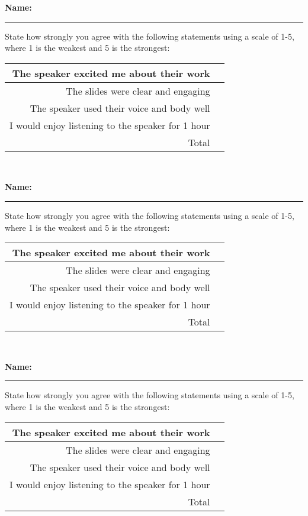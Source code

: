 \documentclass[12pt]{article}
\date{ \ }
\begin{document}
\vspace{5mm}

\noindent\textbf{Name:} \rule{9cm}{0.4pt}

State how strongly you agree with the following statements using a scale of 1-5, where 1 is the weakest and 5 is the strongest: 

\begin{center}
\begin{tabular}{|r| p{2cm} |}
  \hline
The speaker excited me about their work & \\ \hline
The slides were clear and engaging & \\ \hline
The speaker used their voice and body well  & \\ \hline
I would enjoy listening to the speaker for 1 hour & \\ \hline
Total & \\ \hline 
\end{tabular} \\
\end{center}

\vspace{5mm}

\noindent\textbf{Name:} \rule{9cm}{0.4pt}

State how strongly you agree with the following statements using a scale of 1-5, where 1 is the weakest and 5 is the strongest: 

\begin{center}
\begin{tabular}{|r| p{2cm} |}
  \hline
The speaker excited me about their work & \\ \hline
The slides were clear and engaging & \\ \hline
The speaker used their voice and body well  & \\ \hline
I would enjoy listening to the speaker for 1 hour & \\ \hline
Total & \\ \hline
\end{tabular} \\
\end{center}

\vspace{5mm}

\noindent\textbf{Name:} \rule{9cm}{0.4pt}

State how strongly you agree with the following statements using a scale of 1-5, where 1 is the weakest and 5 is the strongest: 

\begin{center}
\begin{tabular}{|r| p{2cm} |}
  \hline
The speaker excited me about their work & \\ \hline
The slides were clear and engaging & \\ \hline
The speaker used their voice and body well  & \\ \hline
I would enjoy listening to the speaker for 1 hour & \\ \hline
Total & \\ \hline
\end{tabular}
\end{center}
 
\end{document}
